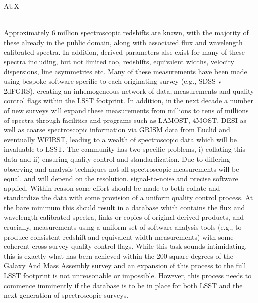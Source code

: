 {\begin{tasklist}{AUX}
\begin{task}
{~\\
Approximately 6 million spectroscopic redshifts are known, with the majority of these already in the public domain, along with associated flux and wavelength calibrated spectra. In addition, derived parameters also exist for many of these spectra including, but not limited too, redshifts, equivalent widths, velocity dispersions, line asymmetries etc. Many of these measurements have been made using bespoke software specific to each originating survey (e.g., SDSS v 2dFGRS), creating an inhomogeneous network of data, measurements and quality control flags within the LSST footprint.
In addition, in the next decade a number of new surveys will expand these measurements from millions to tens of millions of spectra through facilities and programs such as LAMOST, 4MOST, DESI as well as coarse spectroscopic information via GRISM data from Euclid and eventually WFIRST, leading to a wealth of spectroscopic data which will be invaluable to LSST.
The community has two specific problems, i) collating this data and ii) ensuring quality control and standardization. Due to differing observing and analysis techniques not all spectroscopic measurements will be equal, and will depend on the resolution, signal-to-noise and precise software applied.
Within reason some effort should be made to both collate and standardize the data with some provision of a uniform quality control process. At the bare minimum this should result in a database which contains the flux and wavelength calibrated spectra, links or copies of original derived products, and crucially, measurements using a uniform set of software analysis tools (e.g., to produce consistent redshift and equivalent width measurements) with some coherent cross-survey quality control flags.
While this task sounds intimidating, this is exactly what has been achieved within the 200 square degrees of the Galaxy And Mass Assembly survey \citep{driver2011a,driver2016a,liske2015a} and an expansion of this process to the full LSST footprint is not unreasonable or impossible. However, this process needs to commence imminently if the database is to be in place for both LSST and the next generation of spectroscopic surveys.
}
~\\
\end{task}




\end{tasklist}}
